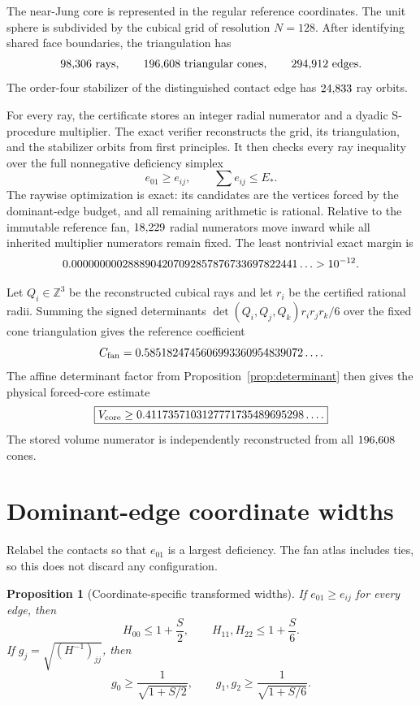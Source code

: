 \documentclass[11pt,reqno]{amsart}
\newtheorem{proposition}[theorem]{Proposition}
\theoremstyle{remark}
\begin{document}
The near-Jung core is represented in the regular reference coordinates.  The
unit sphere is subdivided by the cubical grid of resolution $N=128$.  After
identifying shared face boundaries, the triangulation has
\[
 98{,}306\text{ rays},\qquad
 196{,}608\text{ triangular cones},\qquad
 294{,}912\text{ edges}.
\]
The order-four stabilizer of the distinguished contact edge has
$24{,}833$ ray orbits.

For every ray, the certificate stores an integer radial numerator and a dyadic
S-procedure multiplier.  The exact verifier reconstructs the grid, its
triangulation, and the stabilizer orbits from first principles.  It then checks
every ray inequality over the full nonnegative deficiency simplex
\[
 e_{01}\ge e_{ij},\qquad \sum e_{ij}\le E_*.
\]
The raywise optimization is exact: its candidates are the vertices forced by
the dominant-edge budget, and all remaining arithmetic is rational.  Relative
to the immutable reference fan, $18{,}229$ radial numerators move
inward while all inherited multiplier numerators remain fixed.  The least
nontrivial exact margin is
\[
 0.0000000002888904207092857876733697822441\ldots>10^{-12}.
\]

Let $Q_i\in\mathbb Z^3$ be the reconstructed cubical rays and let $r_i$ be the
certified rational radii.  Summing the signed determinants
$\det(Q_i,Q_j,Q_k)r_ir_jr_k/6$ over the fixed cone triangulation gives the
reference coefficient
\[
 C_{\rm fan}=0.5851824745606993360954839072\ldots.
\]
The affine determinant factor from Proposition~\ref{prop:determinant} then
gives the physical forced-core estimate
\begin{equation}\label{eq:core-volume}
 \boxed{V_{\rm core}\ge0.4117357103127771735489695298\ldots.}
\end{equation}
The stored volume numerator is independently reconstructed from all
$196{,}608$ cones.

\section{Dominant-edge coordinate widths}
\label{sec:width}

Relabel the contacts so that $e_{01}$ is a largest deficiency.  The fan atlas
includes ties, so this does not discard any configuration.

\begin{proposition}[Coordinate-specific transformed widths]\label{prop:widths}
If $e_{01}\ge e_{ij}$ for every edge, then
\[
 H_{00}\le1+\frac S2,
 \qquad
 H_{11},H_{22}\le1+\frac S6.
\]
If $g_j=\sqrt{(H^{-1})_{jj}}$, then
\begin{equation}\label{eq:width-lower}
 g_0\ge\frac1{\sqrt{1+S/2}},
 \qquad
 g_1,g_2\ge\frac1{\sqrt{1+S/6}}.
\end{equation}
\end{proposition}
\end{document}
